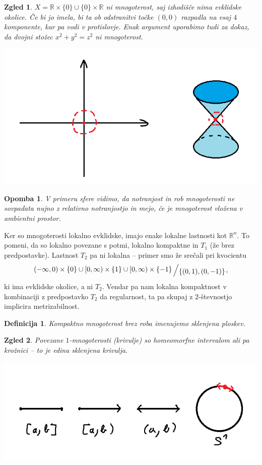 \documentclass[10pt, a4paper]{article}
\newtheorem{defi}{Definicija}[section]
\newenvironment{noticeB}{%
  \tcolorbox[%
  notitle,
  empty,
  enhanced,  %
  breakable,
  coltext=black,
  colback=white, 
  fontupper=\rmfamily,
  parbox=false,
  noparskip,
  sharp corners,
  boxrule=-1pt,  %
  frame hidden,
  left=7pt,  %
  right=7pt,
  top=5pt,
  bottom=5pt,
  before skip=2.5ex plus 2pt,
  after skip=2.5ex plus 2pt,
  borderline west = {1.5pt}{-0.1pt}{blue!30!black}, %
  overlay unbroken and last={%
    \draw[color=black, line width=1.25pt]
    ($(frame.south west)+(1.pt, -0.1pt)$) -- ++(2em, 0);
  }
  ]}
{\endtcolorbox}
\newenvironment{definicija}{\begin{defi}\begin{noticeB}}{%
    \end{noticeB}\end{defi}}
\newtheorem*{opomba}{Opomba}
\newtheorem{zgled}{Zgled}[section]
\newcommand{\R}{\mathbb {R}}
\newcommand{\quot}[2]{{\raisebox{0.1em}{$#1$}\left/\raisebox{-0.2em}{$#2$}\right.}}
\begin{document}
\begin{zgled}
  $X = \R \times \{0\} \cup \{0\} \times \R$ ni mnogoterost, saj izhodišče nima evklidske okolice. 
  Če bi jo imela, bi ta ob odstranitvi točke $(0, 0)$ razpadla na vsaj $4$ komponente, kar pa vodi v protislovje.
  Enak argument uporabimo tudi za dokaz, da dvojni stožec $x^2 + y^2 = z^2$ ni mnogoterost.  
  \begin{center}
    \includegraphics{zgled8.png}
  \end{center}
\end{zgled}

\begin{opomba}
  V primeru sfere vidimo, da notranjost in rob mnogoterosti ne sovpadata nujno z relativno
  notranjostjo in mejo, če je mnogoterost vložena v ambientni prostor.
\end{opomba}

Ker so mnogoterosti lokalno evklidske, imajo enake lokalne lastnosti kot $\R^n$.
To pomeni, da so lokalno povezane s potmi, lokalno kompaktne in $T_1$ (že brez predpostavke).
Lastnost $T_2$ pa ni lokalna -- primer smo že srečali pri kvocientu $$\quot{(-\infty, 0)\times \{0\} \cup [0, \infty)\times \{1\} \cup [0,\infty)\times\{-1\}}{\{(0, 1), (0, -1)\}},$$
ki ima evklidske okolice, a ni $T_2$. Vendar pa nam lokalna kompaktnost v kombinaciji 
z predpostavko $T_2$ da regularnost, ta pa skupaj z $2$-števnostjo implicira metrizabilnost.

\begin{definicija}
  Kompaktno mnogoterost brez roba imenujemo sklenjena ploskev.
\end{definicija}

\begin{zgled} 
    Povezane $1$-mnogoterosti (krivulje) so homeomorfne intervalom 
    ali pa krožnici -- to je edina sklenjena krivulja.
    \begin{center}
      \includegraphics[scale=0.6]{zgled9.png}
    \end{center}
  \end{zgled}
\end{document}
